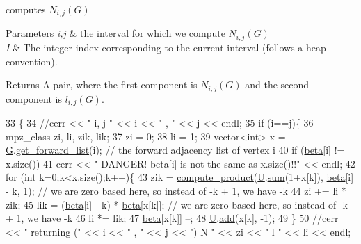 computes $N_{i,j}(G)$ 


\begin{DoxyParams}{Parameters}
{\em i,j} & the interval for which we compute $N_{i,j}(G)$ \\
\hline
{\em I} & The integer index corresponding to the current interval (follows a heap convention). \\
\hline
\end{DoxyParams}
\begin{DoxyReturn}{Returns}
A pair, where the first component is $N_{i,j}(G)$ and the second component is $l_{i,j}(G)$. 
\end{DoxyReturn}

\begin{DoxyCode}
33 \{
34   \textcolor{comment}{//cerr << " i, j " << i << " , " << j << endl;}
35   \textcolor{keywordflow}{if} (i==j)\{
36     mpz\_class zi, li, zik, lik;
37     zi = 0;
38     li = 1;
39     vector<int> x = \hyperlink{classgraph__encoder_a56d8ab1a423e192c6f80514ff5e5cfec}{G}.\hyperlink{classgraph_aa8fbee52a7b3604dbbd9175040c7ead5}{get\_forward\_list}(i); \textcolor{comment}{// the forward adjacency list of vertex i}
40     \textcolor{keywordflow}{if} (\hyperlink{classgraph__encoder_a40880adecfd63fb86e94b4b0fc3f6bc2}{beta}[i] != x.size())
41       cerr << \textcolor{stringliteral}{" DANGER! beta[i] is not the same as x.size()!!"} << endl;
42     \textcolor{keywordflow}{for} (\textcolor{keywordtype}{int} k=0;k<x.size();k++)\{
43       zik = \hyperlink{compression__helper_8cpp_ac683dff9ff89796df0ab62cd65c30990}{compute\_product}(\hyperlink{classgraph__encoder_a3314c40920f2ee132958a6b0ce7e7995}{U}.\hyperlink{classreverse__fenwick__tree_a672731fd6395b4853430073a099a80e6}{sum}(1+x[k]), \hyperlink{classgraph__encoder_a40880adecfd63fb86e94b4b0fc3f6bc2}{beta}[i] - k, 1); \textcolor{comment}{// we are zero based
       here, so instead of -k + 1, we have -k}
44       zi += li * zik;
45       lik = (\hyperlink{classgraph__encoder_a40880adecfd63fb86e94b4b0fc3f6bc2}{beta}[i] - k) * \hyperlink{classgraph__encoder_a40880adecfd63fb86e94b4b0fc3f6bc2}{beta}[x[k]]; \textcolor{comment}{// we are zero based here, so instead of -k + 1, we have -k}
46       li *= lik;
47       \hyperlink{classgraph__encoder_a40880adecfd63fb86e94b4b0fc3f6bc2}{beta}[x[k]] --;
48       \hyperlink{classgraph__encoder_a3314c40920f2ee132958a6b0ce7e7995}{U}.\hyperlink{classreverse__fenwick__tree_a942d7f49b37e53ebfec3076d177691d7}{add}(x[k], -1);
49     \}
50     \textcolor{comment}{//cerr << " returning (" << i << " , " << j << ") N " << zi << " l " << li << endl;}

\end{DoxyCode}
